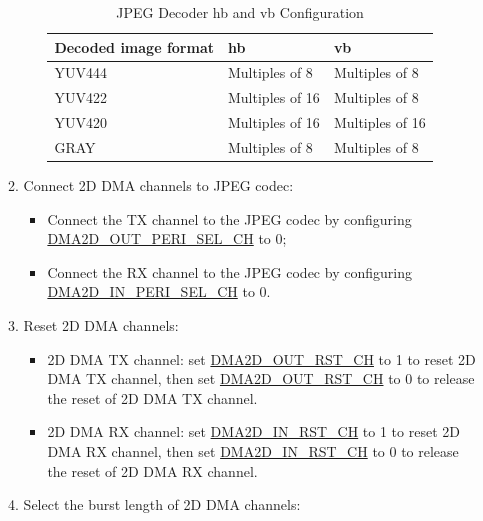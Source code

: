 \documentclass[main\_\_EN.tex]{subfiles}
\begin{document}
\begin{enumerate}
\begin{enumerate}
\begin{itemize}
        \begin{longtable}{ | L{4cm} | L{3cm} | L{3cm} | }
        \caption{JPEG Decoder hb and vb Configuration} \label{tab:de_hb_vb}
        \\ \hline
        \textbf{Decoded image format}  &  \textbf{hb}  &  \textbf{vb}\\ \hline
        YUV444 &  Multiples of 8 &  Multiples of 8  \\ \hline
        YUV422 &  Multiples of 16 &  Multiples of 8  \\ \hline
        YUV420 &  Multiples of 16 &  Multiples of 16  \\ \hline
        GRAY &  Multiples of 8 &  Multiples of 8  \\ \hline
        \end{longtable}
        \end{itemize}
        \item Connect 2D DMA channels to JPEG codec:
        \begin{itemize}
            \item Connect the TX channel to the JPEG codec by configuring \hyperref[fielddesc:DMA2DOUTPERISELCHN]{DMA2D\_OUT\_PERI\_SEL\_CH} to 0;
            \item Connect the RX channel to the JPEG codec by configuring \hyperref[fielddesc:DMA2DINPERISELCHN]{DMA2D\_IN\_PERI\_SEL\_CH} to 0.
        \end{itemize}
        \item Reset 2D DMA channels:
        \begin{itemize}
            \item 2D DMA TX channel: set \hyperref[fielddesc:DMA2DOUTRSTCHN]{DMA2D\_OUT\_RST\_CH} to 1 to reset 2D DMA TX channel, then set \hyperref[fielddesc:DMA2DOUTRSTCHN]{DMA2D\_OUT\_RST\_CH} to 0 to release the reset of 2D DMA TX channel.
            \item 2D DMA RX channel: set \hyperref[fielddesc:DMA2DINRSTCHN]{DMA2D\_IN\_RST\_CH} to 1 to reset 2D DMA RX channel, then set \hyperref[fielddesc:DMA2DINRSTCHN]{DMA2D\_IN\_RST\_CH} to 0 to release the reset of 2D DMA RX channel.
        \end{itemize}
        \item Select the burst length of 2D DMA channels:
        \begin{itemize}

\end{itemize}
\end{enumerate}
\end{enumerate}
\end{document}
